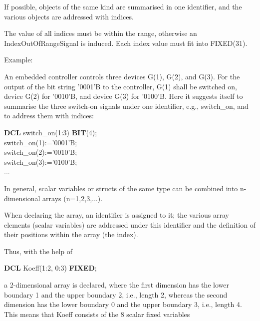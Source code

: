 If possible, objects of the same kind are summarised in
one identifier, and the various objects are addressed with indices.

The value of all indices must be within the range, otherwise
an IndexOutOfRangeSignal is induced.
Each index value must fit into FIXED(31). 

Example:

An embedded controller controls three devices G(1), G(2), and G(3). For
the output of the bit string '0001'B to the controller, G(1) shall be
switched on, device G(2) for '0010'B, and device G(3) for '0100'B. Here it
suggests itself to summarise the three switch-on signals under one
identifier, e.g., switch\_on, and to address them with indices:

{\bf DCL} switch\_on(1:3) {\bf BIT}(4);\\
switch\_on(1):='0001'B;\\
switch\_on(2):='0010'B;\\
switch\_on(3):='0100'B;\\
...


In general, scalar variables
 or structs
of the same type can be combined into
n-dimensional arrays (n=1,2,3,...).

When declaring the array, an identifier is assigned to it; the various
array elements (scalar variables) are addressed under this identifier
and the definition of their positions within the array (the index).

Thus, with the help of

{\bf DCL} Koeff(1:2, 0:3) {\bf FIXED};

a 2-dimensional array is declared, where the first dimension has the
lower boundary 1 and the upper boundary 2, i.e., length 2, whereas the
second dimension has the lower boundary 0 and the upper boundary 3,
i.e., length 4.  This means that Koeff consists of the 8 scalar fixed
variables

